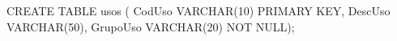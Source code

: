\lstset{caption=Crear tabla ``usos'',label=sql:crearTablaUsos}
\begin{SQL}
CREATE TABLE usos (
CodUso VARCHAR(10) PRIMARY KEY,
DescUso VARCHAR(50),
GrupoUso VARCHAR(20) NOT NULL);
\end{SQL}